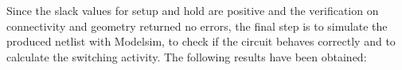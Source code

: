 \vspace{5mm}

Since the slack values for setup and hold are positive and the verification on connectivity and geometry returned no errors, the final step is to simulate the
produced netlist with Modelsim, to check if the circuit behaves correctly and to calculate the switching activity. The following results have been obtained:



